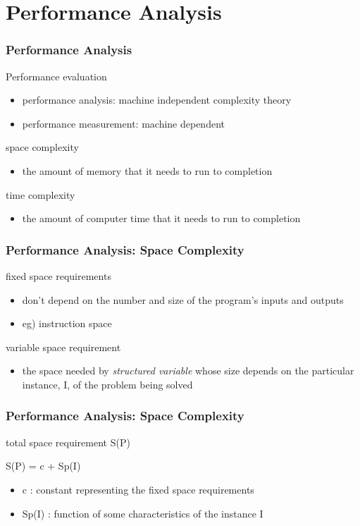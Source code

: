 \documentclass[newPxFont,sthlmFooter,nooffset]{beamer}
\begin{document}
\section{Performance Analysis}
\begin{frame}[t]
  \frametitle{Performance Analysis}
Performance evaluation 
\begin{itemize}
\item performance analysis: machine independent complexity theory 
\item performance measurement: machine dependent
\end{itemize}

space complexity
\begin{itemize}
\item the amount of memory that it needs to run to completion
\end{itemize}

time complexity
\begin{itemize}
\item the amount of computer time that it needs to run to completion
\end{itemize}

\end{frame}

\begin{frame}[t]
  \frametitle{Performance Analysis: Space Complexity}
fixed space requirements
\begin{itemize}
\item don’t depend on the number and size of the program’s inputs and
  outputs
\item eg) instruction space
\end{itemize}

variable space requirement
\begin{itemize}
\item the space needed by \textit{structured variable} whose size depends on
  the particular instance, I, of the problem being solved
\end{itemize}

\end{frame}

\begin{frame}[t, fragile]
  \frametitle{Performance Analysis: Space Complexity}
total space requirement S(P)
\begin{codedef}
  S(P) = c + Sp(I)
\end{codedef}

\begin{itemize}
\item c : constant representing the fixed space requirements 
\item Sp(I) : function of some characteristics of the instance I
\end{itemize}

\end{frame}
\end{document}
